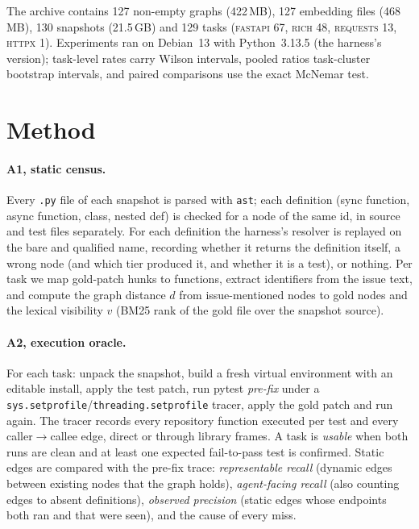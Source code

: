 \documentclass[10pt,a4paper]{article}
\begin{document}
The archive contains 127 non-empty graphs (422\,MB), 127 embedding files (468\,MB), 130 snapshots (21.5\,GB) and 129 tasks (\textsc{fastapi} 67, \textsc{rich} 48, \textsc{requests} 13, \textsc{httpx} 1). Experiments ran on Debian~13 with Python~3.13.5 (the harness's version); task-level rates carry Wilson intervals, pooled ratios task-cluster bootstrap intervals, and paired comparisons use the exact McNemar test.

\section{Method}
\paragraph{A1, static census.} Every \texttt{.py} file of each snapshot is parsed with \texttt{ast}; each definition (sync function, async function, class, nested def) is checked for a node of the same id, in source and test files separately. For each definition the harness's resolver is replayed on the bare and qualified name, recording whether it returns the definition itself, a wrong node (and which tier produced it, and whether it is a test), or nothing. Per task we map gold-patch hunks to functions, extract identifiers from the issue text, and compute the graph distance $d$ from issue-mentioned nodes to gold nodes and the lexical visibility $v$ (BM25 rank of the gold file over the snapshot source).

\paragraph{A2, execution oracle.} For each task: unpack the snapshot, build a fresh virtual environment with an editable install, apply the test patch, run pytest \emph{pre-fix} under a \texttt{sys.setprofile}/\texttt{threading.setprofile} tracer, apply the gold patch and run again. The tracer records every repository function executed per test and every caller$\to$callee edge, direct or through library frames. A task is \emph{usable} when both runs are clean and at least one expected fail-to-pass test is confirmed. Static edges are compared with the pre-fix trace: \emph{representable recall} (dynamic edges between existing nodes that the graph holds), \emph{agent-facing recall} (also counting edges to absent definitions), \emph{observed precision} (static edges whose endpoints both ran and that were seen), and the cause of every miss.
\end{document}
